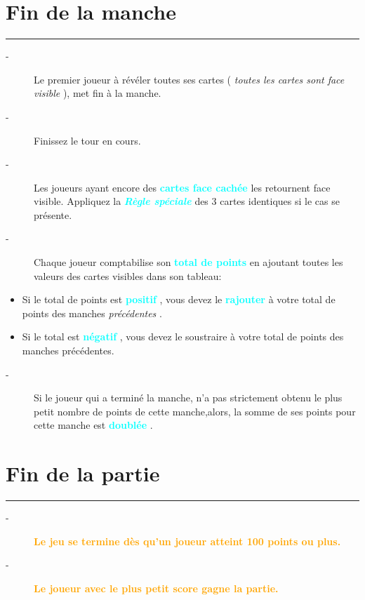 \documentclass{article}%
\begin{document}
%
\sectionfont{\color{cyan}}%
\subsectionfont{\color{cyan}}%
\subsubsectionfont{\color{cyan}}%
\section{ Fin de la manche
}%
\label{sec:Findelamanche}%
\textcolor{cyan}{\rule{18cm}{0.07cm}}\break%
\begin{description}%
\item[{-} ]%
%
Le premier joueur à révéler toutes ses cartes (%
\textit{toutes les cartes sont face visible}%
), met fin à la manche.
%
\item[{-} ]%
%
 Finissez le tour en cours.
%
\item[{-} ]%
%
 Les joueurs ayant encore des %
\textcolor{cyan}{%
\textbf{cartes face cachée}%
}%
\textit{ }%
 les retournent face visible. Appliquez la %
\textcolor{cyan}{\textbf{\textit{Règle spéciale}}}%
\textit{ }%
 des 3 cartes identiques si le cas se présente.
%
\item[{-} ]%
%
 Chaque joueur comptabilise son %
\textcolor{cyan}{%
\textbf{total de points}%
}%
\textit{ }%
 en ajoutant toutes les valeurs des cartes visibles dans son tableau:
%
\end{description}%
\begin{itemize}%
\item%
%
 Si le total de points est %
\textcolor{cyan}{%
\textbf{positif}%
}%
, vous devez le %
\textcolor{cyan}{%
\textbf{rajouter}%
}%
\textit{ }%
 à votre total de points des manches %
\textit{précédentes}%
.
%
\item%
%
 Si le total est %
\textcolor{cyan}{%
\textbf{négatif}%
}%
, vous devez le soustraire à votre total de points des manches précédentes.
%
\end{itemize}%
\begin{description}%
\item[{-} ]%
%
Si le joueur qui a terminé la manche, n’a pas strictement obtenu le plus petit nombre de points de cette manche,alors, la somme de ses points pour cette manche est %
\textcolor{cyan}{%
\textbf{doublée}%
}%
.
%
\end{description}

%
\sectionfont{\color{orange}}%
\subsectionfont{\color{orange}}%
\subsubsectionfont{\color{orange}}%
\section{ Fin de la partie
}%
\label{sec:Findelapartie}%
\textcolor{orange}{\rule{18cm}{0.07cm}}\break%
\begin{description}%
\item[{-} ]%
%
\textcolor{orange}{%
\textbf{Le jeu se termine dès qu’un joueur atteint 100 points ou plus.}%
}%

%
\item[{-} ]%
%
\textcolor{orange}{%
\textbf{Le joueur avec le plus petit score gagne la partie.}%
}%
\end{description}

%
\end{document}
